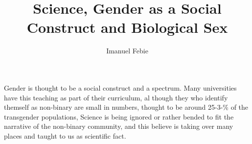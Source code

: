 \documentclass[12pt]{article}
\begin{document}
\title{Science, Gender as a Social Construct and Biological Sex}
\author{Imanuel Febie}
\maketitle


Gender is thought to be a social construct and a spectrum. Many universities have this teaching as part of their curriculum, al though they who identify themself as non-binary are small in numbers, thought to be around 25-3-\% of the transgender populations,  Science is being ignored or rather bended to fit the narrative of the non-binary community, and this believe is taking over many places and taught to us as scientific fact.  

 

 

 
 
\end{document}
